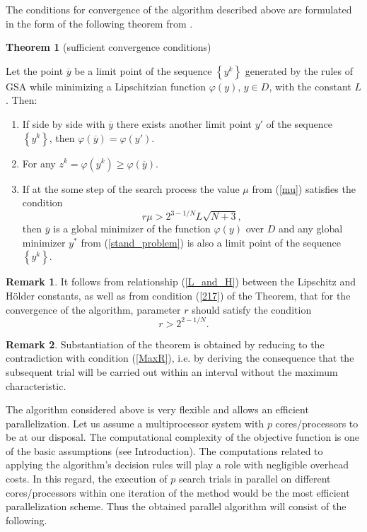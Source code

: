 \documentclass[smallcondensed]{svjour3}     %
\begin{document}
The conditions for convergence of the algorithm described above are formulated in the form of the following theorem from \cite{Strongin2000}.


\textbf{Theorem 1} (sufficient convergence conditions)

Let the point $\overline{y}$ be a limit point of the sequence $\left\{y^k\right\}$ generated by the rules of GSA while minimizing a Lipschitzian function $\varphi(y)$, $y \in D$, with the constant $L$. Then:
\begin{enumerate}
	\item 
	If side by side with $\overline{y}$ there exists another limit point $y'$ of the sequence $\left\{y^k\right\}$, then $\varphi (\overline{y}) = \varphi (y')$.
	\item
	For any  $z^k=\varphi(y^k) \geq \varphi(\overline{y})$.
	\item
	If at the some step of the search process the value $\mu$ from (\ref{mu}) satisfies the condition
\begin{equation}\label{217}
r \mu > 2^{3-1/N}L\sqrt{N+3},
\end{equation}
then $\overline{y}$ is a global minimizer of the function $\varphi (y)$ over $D$ and any global minimizer $y^\ast$ from (\ref{stand_problem}) is also a limit point of the sequence $\left\{y^k\right\}$.
\end{enumerate}

\textbf{Remark 1}. It follows from relationship (\ref{L_and_H}) between the Lipschitz and H{\"o}lder constants, as well as from condition (\ref{217}) of the Theorem, that for the convergence of the algorithm, parameter $r$ should satisfy the condition
\begin{equation}\label{218}
r > 2^{2-1/N}.
\end{equation}

\textbf{Remark 2}. Substantiation of the theorem is obtained by reducing to the contradiction with condition (\ref{MaxR}), i.e. by deriving the consequence that the subsequent trial will be carried out within an interval without the maximum characteristic.

The algorithm considered above is very flexible and allows an efficient parallelization. Let us assume a multiprocessor system with $p$ cores/processors to be at our disposal. The computational complexity of the objective function is one of the basic assumptions (see Introduction). The computations related to applying the algorithm's decision rules will play a role with negligible overhead costs. In this regard, the execution of $p$ search trials in parallel on different cores/processors within one iteration of the method would be the most efficient parallelization scheme. Thus the obtained parallel algorithm will consist of the following.
\end{document}
